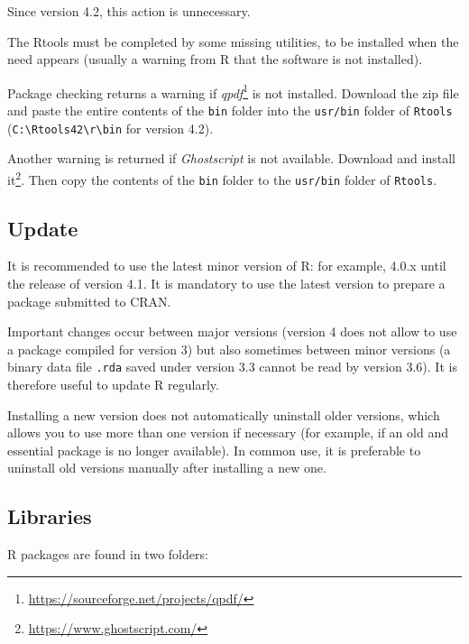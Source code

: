 \documentclass[
  12pt,
  american,
  a4paper,
  extrafontsizes,onecolumn,openright
  ]{memoir}
\begin{document}
\normalsize

Since version 4.2, this action is unnecessary.

The Rtools must be completed by some missing utilities, to be installed when the need appears (usually a warning from R that the software is not installed).

Package checking returns a warning if \emph{qpdf}\footnote{\url{https://sourceforge.net/projects/qpdf/}} is not installed.
Download the zip file and paste the entire contents of the \texttt{bin} folder into the \texttt{usr/bin} folder of \texttt{Rtools} (\texttt{C:\textbackslash{}Rtools42\textbackslash{}r\textbackslash{}bin} for version 4.2).

Another warning is returned if \emph{Ghostscript} is not available.
Download and install it\footnote{\url{https://www.ghostscript.com/}}.
Then copy the contents of the \texttt{bin} folder to the \texttt{usr/bin} folder of \texttt{Rtools}.

\subsection{Update}\label{update}

It is recommended to use the latest minor version of R: for example, 4.0.x until the release of version 4.1.
It is mandatory to use the latest version to prepare a package submitted to CRAN.

Important changes occur between major versions (version 4 does not allow to use a package compiled for version 3) but also sometimes between minor versions (a binary data file \texttt{.rda} saved under version 3.3 cannot be read by version 3.6).
It is therefore useful to update R regularly.

Installing a new version does not automatically uninstall older versions, which allows you to use more than one version if necessary (for example, if an old and essential package is no longer available).
In common use, it is preferable to uninstall old versions manually after installing a new one.

\subsection{Libraries}\label{sec:librairies}

R packages are found in two folders:
\end{document}
